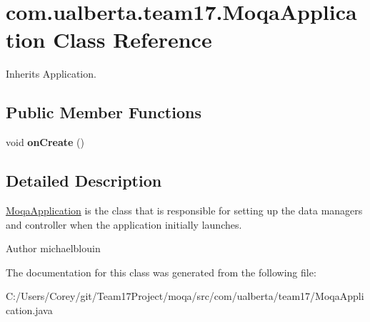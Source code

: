 \hypertarget{classcom_1_1ualberta_1_1team17_1_1_moqa_application}{\section{com.\+ualberta.\+team17.\+Moqa\+Application Class Reference}
\label{classcom_1_1ualberta_1_1team17_1_1_moqa_application}
}


Inherits Application.

\subsection*{Public Member Functions}
\begin{DoxyCompactItemize}
\item 
\hypertarget{classcom_1_1ualberta_1_1team17_1_1_moqa_application_ac94503ed1889fb69878cbdd878e83c15}{void {\bfseries on\+Create} ()}\label{classcom_1_1ualberta_1_1team17_1_1_moqa_application_ac94503ed1889fb69878cbdd878e83c15}

\end{DoxyCompactItemize}


\subsection{Detailed Description}
\hyperlink{classcom_1_1ualberta_1_1team17_1_1_moqa_application}{Moqa\+Application} is the class that is responsible for setting up the data managers and controller when the application initially launches.

\begin{DoxyAuthor}{Author}
michaelblouin 
\end{DoxyAuthor}


The documentation for this class was generated from the following file\+:\begin{DoxyCompactItemize}
\item 
C\+:/\+Users/\+Corey/git/\+Team17\+Project/moqa/src/com/ualberta/team17/Moqa\+Application.\+java\end{DoxyCompactItemize}
